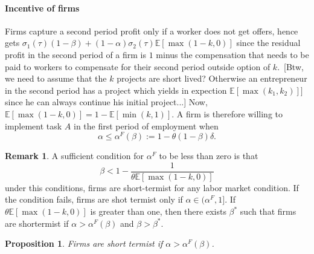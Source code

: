 \documentclass[12pt]{article}
\newtheorem{proposition}{Proposition} \theoremstyle{definition}
\newtheorem{remark}{Remark}
\newcommand{\E}[1]{\mathbb E[#1]}
\begin{document}
\paragraph{Incentive of firms}
Firms capture a second period profit only if a worker does not get offers, hence gets $\sigma_1(\tau)(1-\beta)+(1-\alpha)\sigma_2(\tau)\E{\max(1-k,0)}$ since the residual profit in the second period of a firm is $1$ minus the compensation that needs to be paid to workers to compensate for their second period outside option of $k$. [Btw, we need to assume that the $k$ projects are short lived? Otherwise an entrepreneur in the second period has a project which yields in expection $\E{\max(k_1,k_2)}]$ since he can always continue his initial project...]
%
Now, $\E{\max(1-k,0)}=1-\E{\min(k,1)}$. A firm is therefore willing to implement task $A$ in the first period of employment when
%
\begin{equation}
    \alpha \leq \alpha^F(\beta):=1-\theta  (1-\beta)\delta.
\end{equation}
%
\begin{remark}
    A sufficient condition for $\alpha^F$ to be less than zero is that
    \[
\beta < 1-  \frac{1}{\theta\E{\max(1-k,0)}}  
    \]
    under this conditions, firms are short-termist for any labor market condition. If the condition fails, firms are shot termist only if $\alpha\in(\alpha^F,1]$. If $\theta  \E{\max(1-k,0)}$ is greater than one, then there exists $\beta^*$ such that firms are shortermist if $\alpha>\alpha^F(\beta)$ and $\beta>\beta^*$.
\end{remark}
%
\begin{proposition}
 Firms are short termist if $\alpha >\alpha^F(\beta)$.
\end{proposition}
%
\end{document}
